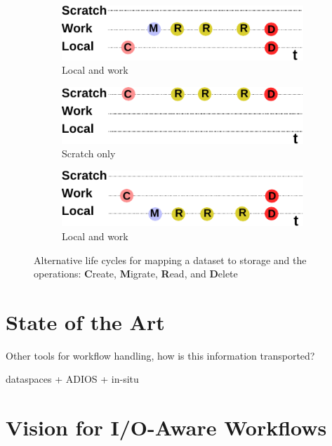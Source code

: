 \documentclass[a4paper]{article}
\newcommand{\jk}[1]{\todo[inline]{JK: #1}}
\begin{document}
\begin{figure}[tb]
  \centering
  \begin{subfigure}{.45\textwidth}
  \includegraphics[width=0.9\columnwidth]{lifecycle-1}
  \caption{Local and work}
  \end{subfigure}
  \begin{subfigure}{.45\textwidth}
  \includegraphics[width=0.9\columnwidth]{lifecycle-2}
  \caption{Scratch only}
  \end{subfigure}

  \begin{subfigure}{.45\textwidth}
  \includegraphics[width=0.9\columnwidth]{lifecycle-3}
  \caption{Local and work}
  \end{subfigure}

  \caption{Alternative life cycles for mapping a dataset to storage and the operations: \textbf{C}reate, \textbf{M}igrate, \textbf{R}ead, and \textbf{D}elete}
  \label{fig:lifecycle}
\end{figure}


\section{State of the Art}

Other tools for workflow handling, how is this information transported?

dataspaces + ADIOS + in-situ

\jk{TODO}


\section{Vision for I/O-Aware Workflows}
\end{document}
